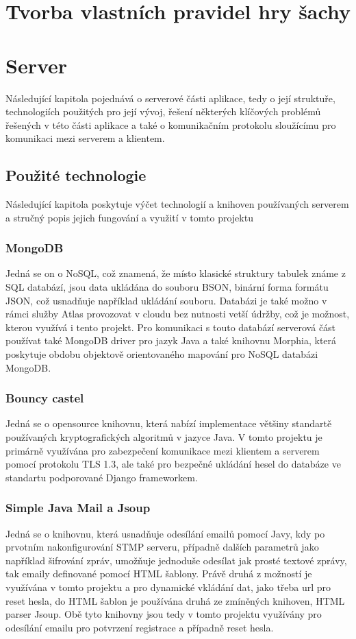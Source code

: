 \documentclass[12pt]{article}
\begin{document}
\section{Tvorba vlastních pravidel hry šachy}
\newpage
\section{Server}
Následující kapitola pojednává o serverové části aplikace, tedy o její struktuře, technologiích použitých pro její vývoj, řešení některých klíčových problémů řešených v této části aplikace a také o komunikačním protokolu sloužícímu pro komunikaci mezi serverem a klientem.
\subsection{Použité technologie}
Následující kapitola poskytuje výčet technologií a knihoven používaných serverem a stručný popis jejich fungování a využití v tomto projektu
\subsubsection{MongoDB}
Jedná se on o NoSQL, což znamená, že místo klasické struktury tabulek známe z SQL databází, jsou data ukládána do souboru BSON, binární forma formátu JSON, což usnadňuje například ukládání souboru. Databázi je také možno v rámci služby Atlas provozovat v cloudu bez nutnosti vetší údržby, což je možnost, kterou využívá i tento projekt. Pro komunikaci s touto databází serverová část používat také MongoDB driver pro jazyk Java a také knihovnu Morphia, která poskytuje obdobu objektově orientovaného mapování pro NoSQL databázi MongoDB.
\subsubsection{Bouncy castel}
Jedná se o opensource knihovnu, která nabízí implementace většiny standartě používaných kryptografických algoritmů v jazyce Java\cite{bouncyCastle}. V tomto projektu je primárně využívána pro zabezpečení komunikace mezi klientem a serverem pomocí protokolu TLS 1.3, ale také pro bezpečné ukládání hesel do databáze ve standartu podporované Django frameworkem.
\subsubsection{Simple Java Mail a Jsoup}
Jedná se o knihovnu, která usnadňuje odesílání emailů pomocí Javy, kdy po prvotním nakonfigurování STMP serveru, případně dalších parametrů jako například šifrování zpráv, umožňuje jednoduše odesílat jak prosté textové zprávy, tak emaily definované pomocí HTML šablony. Právě druhá z možností je využívána v tomto projektu a pro dynamické vkládání dat, jako třeba url pro reset hesla, do HTML šablon je používána druhá ze zmíněných knihoven, HTML parser Jsoup. Obě tyto knihovny jsou tedy v tomto projektu využívány  pro odesílání emailu pro potvrzení registrace a případně reset hesla.
\end{document}

